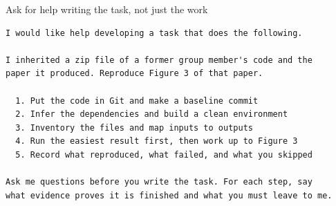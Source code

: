 \begin{frame}[fragile]{Ask for help writing the task, not just the work}
  \vspace{-0.15cm}
  \begin{lstlisting}[basicstyle=\ttfamily\scriptsize]
I would like help developing a task that does the following.

I inherited a zip file of a former group member's code and the
paper it produced. Reproduce Figure 3 of that paper.

  1. Put the code in Git and make a baseline commit
  2. Infer the dependencies and build a clean environment
  3. Inventory the files and map inputs to outputs
  4. Run the easiest result first, then work up to Figure 3
  5. Record what reproduced, what failed, and what you skipped

Ask me questions before you write the task. For each step, say
what evidence proves it is finished and what you must leave to me.
  \end{lstlisting}
  \vspace{0.15em}
  \begin{center}
  \end{center}
  \vspace{0.35cm plus 1fill}
\end{frame}

